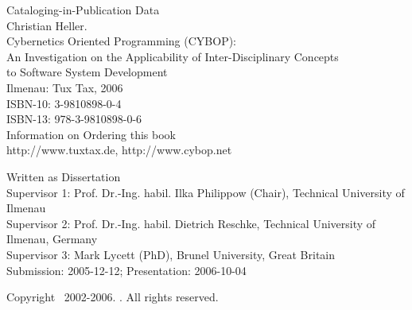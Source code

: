 %
%
%
%
%
%
%

\small{Cataloging-in-Publication Data\\
    Christian Heller.\\
    Cybernetics Oriented Programming (CYBOP):\\
    An Investigation on the Applicability of Inter-Disciplinary Concepts\\
    to Software System Development\\
    Ilmenau: Tux Tax, 2006\\
    ISBN-10: 3-9810898-0-4\\
    ISBN-13: 978-3-9810898-0-6}\\

\small{Information on Ordering this book\\
    http://www.tuxtax.de, http://www.cybop.net}

\small{Written as Dissertation\\
    Supervisor 1: Prof. Dr.-Ing. habil. Ilka Philippow (Chair), Technical University of Ilmenau\\
    Supervisor 2: Prof. Dr.-Ing. habil. Dietrich Reschke, Technical University of Ilmenau, Germany\\
    Supervisor 3: Mark Lycett (PhD), Brunel University, Great Britain\\
    Submission: 2005-12-12; Presentation: 2006-10-04}

\small{Copyright \textcopyright\ 2002-2006. \authormacro. All rights reserved.}

